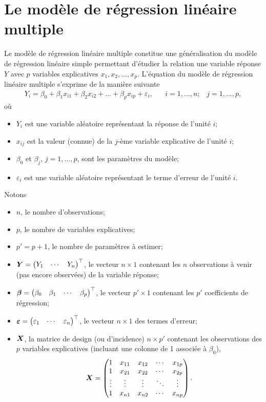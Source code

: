 

\section{Le modèle de régression linéaire multiple}
\label{sec:ModèleEtNotation}

Le modèle de régression linéaire multiple constitue une généralisation du modèle de régression linéaire simple permettant d'étudier la relation une variable réponse $Y$ avec $p$ variables explicatives  $x_1, x_2, ..., x_p$. L'équation du modèle de régression linéaire multiple s'exprime de la manière suivante
\begin{align}\label{eq:reg_lin_mult}
	Y_i = \beta_0 + \beta_1 x_{i1} +  \beta_2 x_{i2}+ \ldots + \beta_p x_{ip} + \varepsilon_i, \;\;\;\;\;\; i=1,\ldots,n;\;\;\; j=1,\ldots,p,
\end{align}
où
\begin{itemize}
\item $Y_i$ est une variable aléatoire représentant la réponse de l'unité $i$;
\item $x_{ij}$ est la valeur (connue) de la $j$-ème variable explicative de l'unité $i$;
\item $\beta_0$ et $\beta_j,\, j=1,\dots, p$, sont les paramètres du modèle;
\item $\varepsilon_i$ est une variable aléatoire représentant le terme d'erreur de l'unité $i$.
\end{itemize}
Notons 
\begin{itemize}
\item $n$, le nombre d'observations;
\item $p$, le nombre de variables explicatives;
\item $p'=p+1$, le nombre de paramètres à estimer;
\item $\bm{Y} = \begin{pmatrix} Y_1 & \cdots & Y_n \end{pmatrix}^\top$, le vecteur $n \times 1$ contenant les $n$ observations à venir (pas encore observées) de la variable réponse;
\item $\bm\beta = \begin{pmatrix} \beta_0 & \beta_1 & \cdots & \beta_p \end{pmatrix}^\top$, le vecteur $p' \times 1$ contenant les $p'$ coefficients de régression;
\item $\bm\varepsilon = \begin{pmatrix} \varepsilon_1 & \cdots & \varepsilon_n \end{pmatrix}^\top$, le vecteur $n\times 1$ des termes d'erreur;
\item $\bm{X}$, la matrice de design (ou d'incidence) $n \times p'$ contenant les observations des $p$ variables explicatives (incluant une colonne de 1 associée à $\beta_0$),
$$\bm{X} = \begin{pmatrix}
        1 & x_{11} & x_{12} & \cdots & x_{1p}  \\
        1 & x_{21} & x_{22} & \cdots & x_{2p}  \\
        \vdots & \vdots & \vdots & \ddots & \vdots \\
        1 & x_{n1} & x_{n2} & \cdots & x_{np}  
    \end{pmatrix}.$$
\end{itemize}
